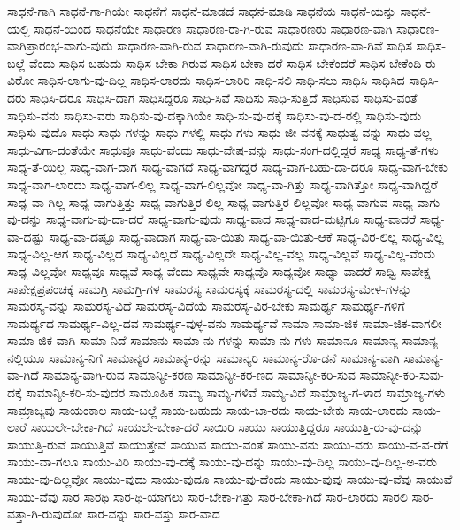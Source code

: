 {ಸಾಧನೆ-ಗಾಗಿ
ಸಾಧನೆ-ಗಾ-ಗಿಯೇ
ಸಾಧನೆಗೆ
ಸಾಧನೆ-ಮಾಡದೆ
ಸಾಧನೆ-ಮಾಡಿ
ಸಾಧನೆಯ
ಸಾಧನೆ-ಯನ್ನು
ಸಾಧನೆ-ಯಲ್ಲಿ
ಸಾಧನೆ-ಯಿಂದ
ಸಾಧನೆಯೇ
ಸಾಧಾರಣ
ಸಾಧಾರಣ-ರಾ-ಗಿ-ರುವ
ಸಾಧಾರಣರು
ಸಾಧಾರಣ-ವಾಗಿ
ಸಾಧಾರಣ-ವಾಗಿಪ್ರಾರಂಭ-ವಾಗು-ವುದು
ಸಾಧಾರಣ-ವಾಗಿ-ರುವ
ಸಾಧಾರಣ-ವಾಗಿ-ರುವುದು
ಸಾಧಾರಣ-ವಾ-ಗಿವೆ
ಸಾಧಿಸ
ಸಾಧಿಸ-ಬಲ್ಲೆ-ವೆಂದು
ಸಾಧಿಸ-ಬಹುದು
ಸಾಧಿಸ-ಬೇಕಾ-ಗಿರುವ
ಸಾಧಿಸ-ಬೇಕಾ-ದರೆ
ಸಾಧಿಸ-ಬೇಕೆಂದರೆ
ಸಾಧಿಸ-ಬೇಕೆಂದಿ-ರು-ವಿರೋ
ಸಾಧಿಸ-ಲಾಗು-ವು-ದಿಲ್ಲ
ಸಾಧಿಸ-ಲಾರದು
ಸಾಧಿಸ-ಲಾರಿರಿ
ಸಾಧಿ-ಸಲಿ
ಸಾಧಿ-ಸಲು
ಸಾಧಿಸಿ
ಸಾಧಿಸಿದ
ಸಾಧಿಸಿ-ದರು
ಸಾಧಿಸಿ-ದರೂ
ಸಾಧಿಸಿ-ದಾಗ
ಸಾಧಿಸಿದ್ದರೂ
ಸಾಧಿ-ಸಿವೆ
ಸಾಧಿಸು
ಸಾಧಿ-ಸುತ್ತಿದೆ
ಸಾಧಿಸುವ
ಸಾಧಿಸು-ವಂತೆ
ಸಾಧಿಸು-ವನು
ಸಾಧಿಸು-ವರು
ಸಾಧಿಸು-ವು-ದಕ್ಕಾಗಿಯೇ
ಸಾಧಿ-ಸು-ವು-ದಕ್ಕೆ
ಸಾಧಿಸು-ವು-ದ-ರಲ್ಲಿ
ಸಾಧಿಸು-ವುದು
ಸಾಧಿಸು-ವುದೊ
ಸಾಧು
ಸಾಧು-ಗಳನ್ನು
ಸಾಧು-ಗಳಲ್ಲಿ
ಸಾಧು-ಗಳು
ಸಾಧು-ಜೀ-ವನಕ್ಕೆ
ಸಾಧುತ್ವ-ವನ್ನು
ಸಾಧು-ವಲ್ಲ
ಸಾಧು-ವಿಗಾ-ದಂತೆಯೇ
ಸಾಧುವೂ
ಸಾಧು-ವೆಂದು
ಸಾಧು-ವೇಷ-ವನ್ನು
ಸಾಧು-ಸಂಗ-ದಲ್ಲಿದ್ದರೆ
ಸಾಧ್ಯ
ಸಾಧ್ಯ-ತೆ-ಗಳು
ಸಾಧ್ಯ-ತೆ-ಯಿಲ್ಲ
ಸಾಧ್ಯ-ವಾಗ-ದಾಗ
ಸಾಧ್ಯ-ವಾಗದೆ
ಸಾಧ್ಯ-ವಾಗದ್ದರೆ
ಸಾಧ್ಯ-ವಾಗ-ಬಹು-ದಾ-ದರೂ
ಸಾಧ್ಯ-ವಾಗ-ಬೇಕು
ಸಾಧ್ಯ-ವಾಗ-ಲಾರದು
ಸಾಧ್ಯ-ವಾಗ-ಲಿಲ್ಲ
ಸಾಧ್ಯ-ವಾಗ-ಲಿಲ್ಲವೋ
ಸಾಧ್ಯ-ವಾ-ಗಿತ್ತು
ಸಾಧ್ಯ-ವಾಗಿತ್ತೋ
ಸಾಧ್ಯ-ವಾಗಿದ್ದರೆ
ಸಾಧ್ಯ-ವಾ-ಗಿಲ್ಲ
ಸಾಧ್ಯ-ವಾಗುತ್ತಿತ್ತು
ಸಾಧ್ಯ-ವಾಗುತ್ತಿರ-ಲಿಲ್ಲ
ಸಾಧ್ಯ-ವಾಗುತ್ತಿರ-ಲಿಲ್ಲವೋ
ಸಾಧ್ಯ-ವಾಗುವ
ಸಾಧ್ಯ-ವಾಗು-ವು-ದನ್ನು
ಸಾಧ್ಯ-ವಾಗು-ವು-ದಾ-ದರೆ
ಸಾಧ್ಯ-ವಾಗು-ವುದು
ಸಾಧ್ಯ-ವಾದ
ಸಾಧ್ಯ-ವಾದ-ಮಟ್ಟಿಗೂ
ಸಾಧ್ಯ-ವಾದರೆ
ಸಾಧ್ಯ-ವಾ-ದಷ್ಟು
ಸಾಧ್ಯ-ವಾ-ದಷ್ಟೂ
ಸಾಧ್ಯ-ವಾದಾಗ
ಸಾಧ್ಯ-ವಾ-ಯಿತು
ಸಾಧ್ಯ-ವಾ-ಯಿತು-ಆಕೆ
ಸಾಧ್ಯ-ವಿರ-ಲಿಲ್ಲ
ಸಾಧ್ಯ-ವಿಲ್ಲ
ಸಾಧ್ಯ-ವಿಲ್ಲ-ಆಗ
ಸಾಧ್ಯ-ವಿಲ್ಲದ
ಸಾಧ್ಯ-ವಿಲ್ಲದೆ
ಸಾಧ್ಯ-ವಿಲ್ಲದೇ
ಸಾಧ್ಯ-ವಿಲ್ಲ-ವಲ್ಲ
ಸಾಧ್ಯ-ವಿಲ್ಲವೆ
ಸಾಧ್ಯ-ವಿಲ್ಲ-ವೆಂದು
ಸಾಧ್ಯ-ವಿಲ್ಲವೋ
ಸಾಧ್ಯವೂ
ಸಾಧ್ಯವೆ
ಸಾಧ್ಯ-ವೆಂದು
ಸಾಧ್ಯವೇ
ಸಾಧ್ಯವೊ
ಸಾಧ್ಯವೋ
ಸಾಧ್ಯಾ-ವಾದರೆ
ಸಾಧ್ವಿ
ಸಾಪೇಕ್ಷ
ಸಾಪೇಕ್ಷಪ್ರಪಂಚಕ್ಕೆ
ಸಾಮಗ್ರಿ
ಸಾಮಗ್ರಿ-ಗಳ
ಸಾಮರಸ್ಯ
ಸಾಮರಸ್ಯಕ್ಕೆ
ಸಾಮರಸ್ಯ-ದಲ್ಲಿ
ಸಾಮರಸ್ಯ-ಮೇಳ-ಗಳನ್ನು
ಸಾಮರಸ್ಯ-ವನ್ನು
ಸಾಮರಸ್ಯ-ವಿದೆ
ಸಾಮರಸ್ಯ-ವಿದೆಯೆ
ಸಾಮರಸ್ಯ-ವಿರ-ಬೇಕು
ಸಾಮರ್ಥ್ಯ
ಸಾಮರ್ಥ್ಯ-ಗಳಿಗೆ
ಸಾಮರ್ಥ್ಯದ
ಸಾಮರ್ಥ್ಯ-ವಿಲ್ಲ-ದವ
ಸಾಮರ್ಥ್ಯ-ವುಳ್ಳ-ವನು
ಸಾಮರ್ಥ್ಯವೆ
ಸಾಮಾ
ಸಾಮಾ-ಜಿಕ
ಸಾಮಾ-ಜಿಕ-ವಾಗಲೀ
ಸಾಮಾ-ಜಿಕ-ವಾಗಿ
ಸಾಮಾ-ನಿದೆ
ಸಾಮಾನು
ಸಾಮಾ-ನು-ಗಳನ್ನು
ಸಾಮಾ-ನು-ಗಳು
ಸಾಮಾನೂ
ಸಾಮಾನ್ಯ
ಸಾಮಾನ್ಯ-ನಲ್ಲಿಯೂ
ಸಾಮಾನ್ಯ-ನಿಗೆ
ಸಾಮಾನ್ಯರ
ಸಾಮಾನ್ಯ-ರನ್ನು
ಸಾಮಾನ್ಯರಿ
ಸಾಮಾನ್ಯ-ರೊ-ಡನೆ
ಸಾಮಾನ್ಯ-ವಾಗಿ
ಸಾಮಾನ್ಯ-ವಾ-ಗಿದೆ
ಸಾಮಾನ್ಯ-ವಾಗಿ-ರುವ
ಸಾಮಾನ್ಯೀ-ಕರಣ
ಸಾಮಾನ್ಯೀ-ಕರ-ಣದ
ಸಾಮಾನ್ಯೀ-ಕರಿ-ಸುವ
ಸಾಮಾನ್ಯೀ-ಕರಿ-ಸುವು-ದಕ್ಕೆ
ಸಾಮಾನ್ಯೀ-ಕರಿ-ಸು-ವುದರ
ಸಾಮೂಹಿಕ
ಸಾಮ್ಯ
ಸಾಮ್ಯ-ಗಳಿವೆ
ಸಾಮ್ಯ-ವಿದೆ
ಸಾಮ್ರಾಜ್ಯ-ಗ-ಳಾದ
ಸಾಮ್ರಾಜ್ಯ-ಗಳು
ಸಾಮ್ರಾಜ್ಯವು
ಸಾಯಂಕಾಲ
ಸಾಯ-ಬಲ್ಲೆ
ಸಾಯ-ಬಹುದು
ಸಾಯ-ಬಾ-ರದು
ಸಾಯ-ಬೇಕು
ಸಾಯ-ಲಾರದು
ಸಾಯ-ಲಾರೆ
ಸಾಯಲೇ-ಬೇಕಾ-ಗಿದೆ
ಸಾಯಲೇ-ಬೇಕಾ-ದರೆ
ಸಾಯಿರಿ
ಸಾಯು
ಸಾಯುತ್ತಿದ್ದರೂ
ಸಾಯುತ್ತಿ-ರು-ವು-ದನ್ನು
ಸಾಯುತ್ತಿ-ರುವೆ
ಸಾಯುತ್ತಿವೆ
ಸಾಯುತ್ತೇವೆ
ಸಾಯುವ
ಸಾಯು-ವಂತೆ
ಸಾಯು-ವನು
ಸಾಯು-ವರು
ಸಾಯು-ವ-ವ-ರೆಗೆ
ಸಾಯು-ವಾ-ಗಲೂ
ಸಾಯು-ವಿರಿ
ಸಾಯು-ವು-ದಕ್ಕೆ
ಸಾಯು-ವು-ದನ್ನು
ಸಾಯು-ವು-ದಿಲ್ಲ
ಸಾಯು-ವು-ದಿಲ್ಲ-ಅ-ವರು
ಸಾಯು-ವು-ದಿಲ್ಲವೋ
ಸಾಯು-ವುದು
ಸಾಯು-ವುದೂ
ಸಾಯು-ವು-ದೆಂದು
ಸಾಯು-ವುವು
ಸಾಯು-ವು-ವೆವು
ಸಾಯುವೆ
ಸಾಯು-ವೆವು
ಸಾರ
ಸಾರಥಿ
ಸಾರ-ಥಿ-ಯಾಗಲು
ಸಾರ-ಬೇಕಾ-ಗಿತ್ತು
ಸಾರ-ಬೇಕಾ-ಗಿದೆ
ಸಾರ-ಲಾರದು
ಸಾರಲಿ
ಸಾರ-ವತ್ತಾ-ಗಿ-ರುವುದೋ
ಸಾರ-ವನ್ನು
ಸಾರ-ವಸ್ತು
ಸಾರ-ವಾದ
}
